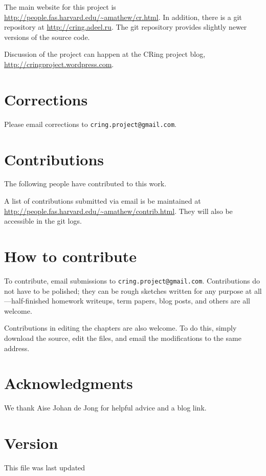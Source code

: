 The main website for this project is 
\url{http://people.fas.harvard.edu/~amathew/cr.html}. In addition, there is a
git repository at \url{http://cring.adeel.ru}. The git repository provides
slightly newer versions of the source code.

Discussion of the project can happen at the CRing project blog,
\url{http://cringproject.wordpress.com}.

\section*{Corrections}

Please email corrections to \texttt{cring.project@gmail.com}.

\section*{Contributions}

The following people have contributed to this work.

\vspace{5mm}
\vspace{5mm}

A list of contributions submitted via email is be maintained at 
\url{http://people.fas.harvard.edu/~amathew/contrib.html}.
They will also be accessible in the git logs.

\section*{How to contribute}

To contribute, email submissions to \texttt{cring.project@gmail.com}. 
Contributions do not have to be polished; they can be rough sketches written
for any purpose at all---half-finished homework writeups, term papers, blog
posts, and others are all welcome.

Contributions in editing the chapters are also welcome. To do this, simply
download the source, edit the files, and email the modifications to the same
address.

\section*{Acknowledgments}

We thank Aise Johan de Jong for helpful advice and a blog link.

\section*{Version}

This file was last updated 

\tableofcontents
